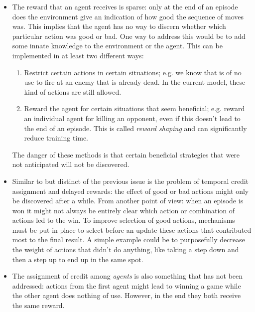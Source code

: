 \begin{itemize}
    \item The reward that an agent receives is sparse: only at the end of an episode does the environment give an indication of how good the sequence of moves was. This implies that the agent has no way to discern whether which particular action was good or bad. One way to address this would be to add some innate knowledge  to the environment or the agent. This can be implemented in at least two different ways:
    \begin{enumerate}
        \item Restrict certain actions in certain situations; e.g. we know that is of no use to fire at an enemy that is already dead. In the current model, these kind of actions are still allowed.
        \item Reward the agent for certain situations that seem beneficial; e.g. reward an individual agent for killing an opponent, even if this doesn't lead to the end of an episode. This is called \emph{reward shaping} and can significantly reduce training time.
    \end{enumerate}
    The danger of these methods is that certain beneficial strategies that were not anticipated will not be discovered.
    \item Similar to but distinct of the previous issue is the problem of temporal credit assignment and delayed rewards: the effect of good or bad actions might only be discovered after a while. From another point of view: when an episode is won it might not always be entirely clear which action or combination of actions led to the win. To improve selection of good actions, mechanisms must be put in place to select before an update these actions that contributed most to the final result. A simple example could be to purposefully decrease the weight of actions that didn't do anything, like taking a step down and then a step up to end up in the same spot.
    \item The assignment of credit among \emph{agents} is also something that has not been addressed: actions from the first agent might lead to winning a game while the other agent does nothing of use. However, in the end they both receive the same reward.
\end{itemize}

